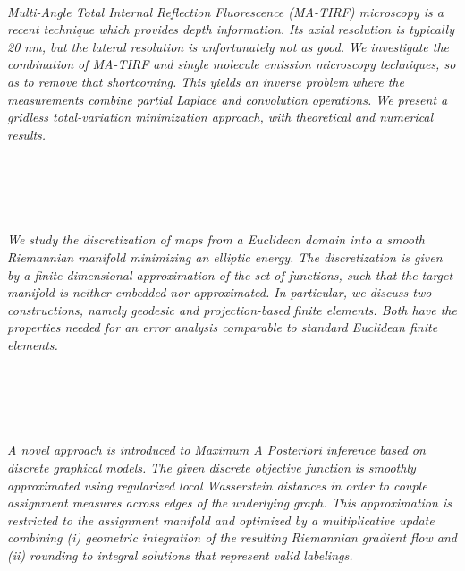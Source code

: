 \begin{multicols}{2}
\\
      \textit{Multi-Angle Total Internal Reflection Fluorescence (MA-TIRF) microscopy is a recent technique which provides depth information. Its axial resolution is typically 20 nm, but the lateral resolution is unfortunately not as good.
We investigate the combination of MA-TIRF and single molecule emission microscopy techniques, so as to remove that shortcoming. This yields an inverse problem where the measurements combine partial Laplace and convolution operations. We present a gridless total-variation minimization approach, with theoretical and numerical results. }\\
\\ 
        \\
        \\\\
\\
      \textit{We study the discretization of maps from a Euclidean domain into a smooth Riemannian manifold minimizing an elliptic energy. The discretization is given by a finite-dimensional approximation of the set of functions, such that the target manifold is neither embedded nor approximated. In particular, we discuss two constructions, namely geodesic and projection-based finite elements. Both have the properties needed for an error analysis comparable to standard Euclidean finite elements.}\\
\\ 
        \\
        \\\\
\\
      \textit{A novel approach  is introduced to Maximum A Posteriori inference based on discrete graphical models. 
The given discrete objective function is smoothly approximated using regularized local Wasserstein distances in order
 to couple assignment measures across edges of the underlying graph. This approximation is restricted to the
 assignment manifold and optimized by a multiplicative update combining (i) geometric integration of the resulting Riemannian gradient flow and (ii) rounding to integral solutions that represent valid labelings.}\\
\\ 
        \\
        \\\\

\end{multicols}
